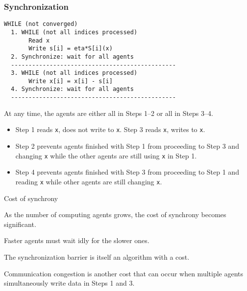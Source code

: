 \documentclass[10pt,mathserif]{beamer}
\begin{document}
\begin{frame}[fragile]
\frametitle{Synchronization}
\begin{lstlisting}
WHILE (not converged)
  1. WHILE (not all indices processed)
       Read x
       Write s[i] = eta*S[i](x)
  2. Synchronize: wait for all agents
  -----------------------------------------------
  3. WHILE (not all indices processed)
       Write x[i] = x[i] - s[i]
  4. Synchronize: wait for all agents
  -----------------------------------------------
\end{lstlisting}
At any time, the agents are either all in Steps 1--2 or all in Steps 3--4.
\begin{itemize}
\item Step 1 reads \verb|x|, does not write to \verb|x|. Step 3 reads \verb|x|, writes to \verb|x|.
\item Step 2 prevents agents finished with Step 1 from proceeding to Step 3 and changing \verb|x| while the other agents are still using \verb|x| in Step 1.
\item Step 4 prevents agents finished with Step 3 from proceeding to Step 1 and reading \verb|x| while other agents are still changing \verb|x|.
\end{itemize}
\end{frame}



\begin{frame}{Cost of synchrony}

As the number of computing agents grows, the cost of synchrony becomes significant.

\bigskip

Faster agents must wait idly for the slower ones.

\bigskip

The synchronization barrier is itself an algorithm with a cost.

\bigskip

Communication congestion is another cost that can occur when multiple agents simultaneously write data in Steps 1 and 3.

\end{frame}
\end{document}
